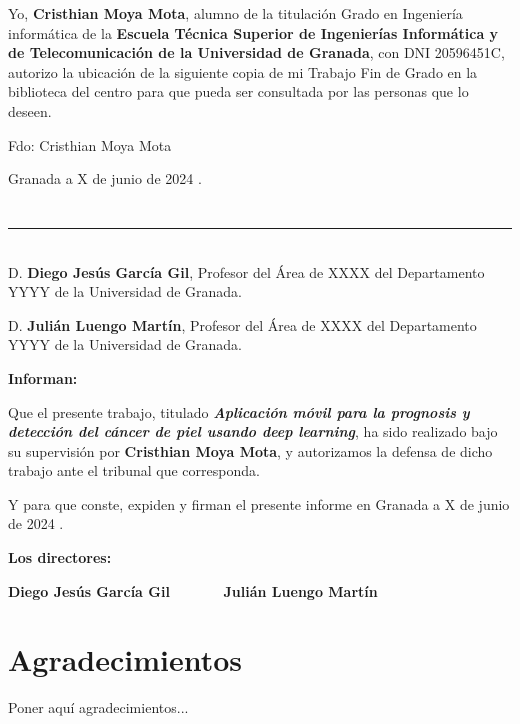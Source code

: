 Yo, \textbf{Cristhian Moya Mota}, alumno de la titulación Grado en Ingeniería informática de la \textbf{Escuela Técnica Superior
de Ingenierías Informática y de Telecomunicación de la Universidad de Granada}, con DNI 20596451C, autorizo la
ubicación de la siguiente copia de mi Trabajo Fin de Grado en la biblioteca del centro para que pueda ser
consultada por las personas que lo deseen.

\vspace{6cm}

\noindent Fdo: Cristhian Moya Mota

\vspace{2cm}

\begin{flushright}
Granada a X de junio de 2024 .
\end{flushright}


\chapter*{}
\thispagestyle{empty}

\noindent\rule[-1ex]{\textwidth}{2pt}\\[4.5ex]

D. \textbf{Diego Jesús García Gil}, Profesor del Área de XXXX del Departamento YYYY de la Universidad de Granada.

\vspace{0.5cm}

D. \textbf{Julián Luengo Martín}, Profesor del Área de XXXX del Departamento YYYY de la Universidad de Granada.


\vspace{0.5cm}

\textbf{Informan:}

\vspace{0.5cm}

Que el presente trabajo, titulado \textit{\textbf{Aplicación móvil para la prognosis y detección del cáncer de piel usando deep learning}},
ha sido realizado bajo su supervisión por \textbf{Cristhian Moya Mota}, y autorizamos la defensa de dicho trabajo ante el tribunal
que corresponda.

\vspace{0.5cm}

Y para que conste, expiden y firman el presente informe en Granada a X de junio de 2024 .

\vspace{1cm}

\textbf{Los directores:}

\vspace{5cm}

\noindent \textbf{Diego Jesús García Gil \ \ \ \ \ \ Julián Luengo Martín}

\chapter*{Agradecimientos}
\thispagestyle{empty}

       \vspace{1cm}


Poner aquí agradecimientos...

